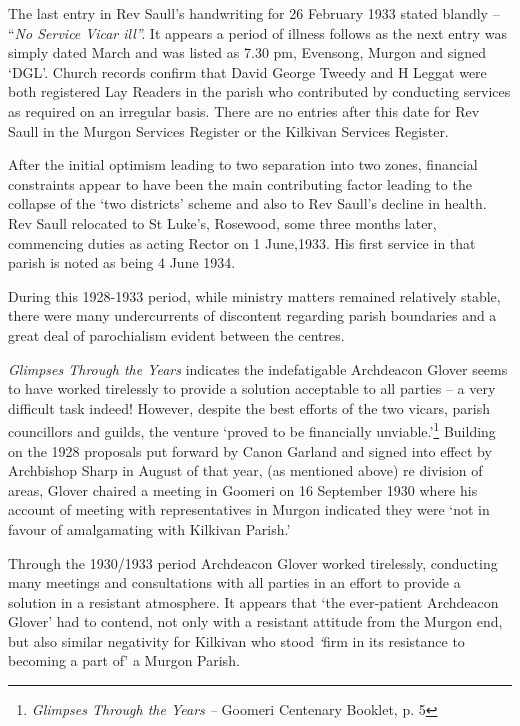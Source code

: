 The last entry in Rev Saull's handwriting for 26 February 1933 stated blandly -- ``\emph{No Service Vicar ill''.} It appears a period of illness follows as the next entry was simply dated March and was listed as 7.30 pm, Evensong, Murgon and signed `DGL'. Church records confirm that David George Tweedy and H Leggat were both registered Lay Readers in the parish who contributed by conducting services as required on an irregular basis. There are no entries after this date for Rev Saull in the Murgon Services Register or the Kilkivan Services Register.

After the initial optimism leading to two separation into two zones, financial constraints appear to have been the main contributing factor leading to the collapse of the `two districts' scheme and also to Rev Saull's decline in health. Rev Saull relocated to St Luke's, Rosewood, some three months later, commencing duties as acting Rector on 1 June,1933. His first service in that parish is noted as being 4 June 1934.

During this 1928-1933 period, while ministry matters remained relatively stable, there were many undercurrents of discontent regarding parish boundaries and a great deal of parochialism evident between the centres.

\emph{Glimpses Through the Years} indicates the indefatigable Archdeacon Glover seems to have worked tirelessly to provide a solution acceptable to all parties -- a very difficult task indeed! However, despite the best efforts of the two vicars, parish councillors and guilds, the venture `proved to be financially unviable.'\footnote{\emph{Glimpses Through the Years --} Goomeri Centenary Booklet, p. 5} Building on the 1928 proposals put forward by Canon Garland and signed into effect by Archbishop Sharp in August of that year, (as mentioned above) re division of areas, Glover chaired a meeting in Goomeri on 16 September 1930 where his account of meeting with representatives in Murgon indicated they were `not in favour of amalgamating with Kilkivan Parish.'

Through the 1930/1933 period Archdeacon Glover worked tirelessly, conducting many meetings and consultations with all parties in an effort to provide a solution in a resistant atmosphere. It appears that `the ever-patient Archdeacon Glover' had to contend, not only with a resistant attitude from the Murgon end, but also similar negativity for Kilkivan who stood \emph{`}firm in its resistance to becoming a part of' a Murgon Parish.

